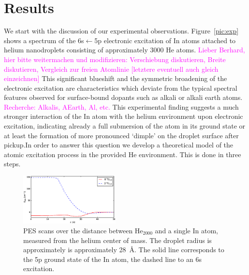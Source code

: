 \documentclass[twoside,twocolumn,9pt]{article}
\def\hl#1{\textcolor{magenta}{#1}}  %
\begin{document}
\section{Results}
We start with the discussion of our experimental observations. Figure~\ref{pic:exp} shows a spectrum of the 6s$\leftarrow{}$5p electronic excitation of In atoms attached to helium nanodroplets consisting of approximately 3000 He atoms. \hl{Lieber Berhard, hier bitte weitermachen und modifizieren: Verschiebung diskutieren, Breite diskutieren, Vergleich zur freien Atomlinie [letztere eventuell auch gleich einzeichnen]} This significant blueshift and the symmetric broadening of the electronic excitation are characteristics which deviate from the typical spectral features observed for surface-bound dopants such as alkali or alkali earth atoms. \hl{Recherche: Alkalis, AEarth, Al, etc.} This experimental finding suggests a much stronger interaction of the In atom with the helium environment upon electronic excitation, indicating already a full submersion of the atom in its ground state or at least the formation of  more pronounced `dimple' on the droplet surface after pickup.In order to answer this question we develop a theoretical model of the atomic excitation process in the provided He environment. This is done in three steps.

\begin{figure}[htbp!]
  	\begin{center}
 		\includegraphics[width=0.45\textwidth]{3.eps}
                \caption{PES scans over the distance between He$_{2000}$ and a single In atom, measured from the helium center of mass. The droplet radius is approximately is approximately 28~\AA. The solid line corresponds to the 5p ground state of the In atom, the dashed line to an 6s excitation.\label{pic:scan}}
  	\end{center}
\end{figure}
\end{document}
